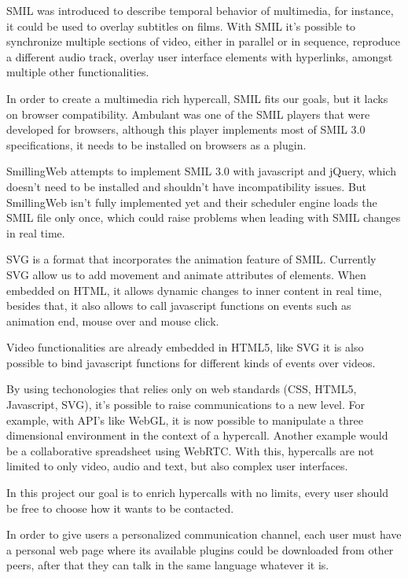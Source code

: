\documentclass[11pt,twocolumn]{article}
\begin{document}
  SMIL\cite{smil} was introduced to describe temporal behavior of multimedia, for instance, it could be used to overlay subtitles on films. With SMIL it's possible to synchronize multiple sections of video, either in parallel or in sequence, reproduce a different audio track, overlay user interface elements with hyperlinks, amongst multiple other functionalities.

  In order to create a multimedia rich hypercall, SMIL fits our goals, but it lacks on browser compatibility. Ambulant \cite{ambulant} was one of the SMIL players that were developed for browsers, although this player implements most of SMIL 3.0 specifications, it needs to be installed on browsers as a plugin.

  SmillingWeb \cite{smillingweb} attempts to implement SMIL 3.0 with javascript and jQuery, which doesn't need to be installed and shouldn't have incompatibility issues. But SmillingWeb isn't fully implemented yet and their scheduler engine loads the SMIL file only once, which could raise problems when leading with SMIL changes in real time.  

  SVG is a format that incorporates the animation feature of SMIL. Currently SVG allow us to add movement and animate attributes of elements. When embedded on HTML, it allows dynamic changes to inner content in real time, besides that, it also allows to call javascript functions on events such as animation end, mouse over and mouse click.

  Video functionalities are already embedded in HTML5, like SVG it is also possible to bind javascript functions for different kinds of events over videos.

  By using techonologies that relies only on web standards (CSS, HTML5, Javascript, SVG), it's possible to raise communications to a new level. For example, with API's like WebGL, it is now possible to manipulate a three dimensional environment in the context of a hypercall. Another example would be a collaborative spreadsheet using WebRTC. With this, hypercalls are not limited to only video, audio and text, but also complex user interfaces.

  In this project our goal is to enrich hypercalls with no limits, every user should be free to choose how it wants to be contacted.

  In order to give users a personalized communication channel, each user must have a personal web page where its available plugins could be downloaded from other peers, after that they can talk in the same language whatever it is.
\end{document}
